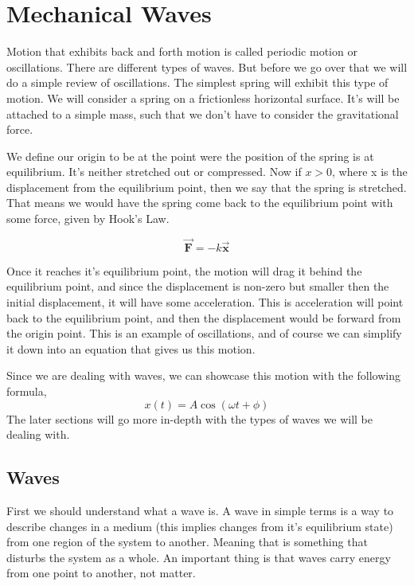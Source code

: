 \chapter{Mechanical Waves}
Motion that exhibits back and forth motion is called periodic motion or oscillations. There are different types of waves. But before we go over that we will do a simple review of oscillations. The simplest spring will exhibit this type of motion. We will consider a spring on a frictionless horizontal surface. It's will be attached to a simple mass, such that we don't have to consider the gravitational force. 

We define our origin to be at the point were the position of the spring is at equilibrium. It's neither stretched out or compressed. Now if $x > 0$, where x is the displacement from the equilibrium point, then we say that the spring is stretched. That means we would have the spring come back to the equilibrium point with some force, given by Hook's Law.

\begin{equation*}
	\vec{\mathbf{F}} = -k\vec{\mathbf{x}}
\end{equation*} 

Once it reaches it's equilibrium point, the motion will drag it behind the equilibrium point, and since the displacement is non-zero but smaller then the initial displacement, it will have some acceleration. This is acceleration will point back to the equilibrium point, and then the displacement would be forward from the origin point. This is an example of oscillations, and of course we can simplify it down into an equation that gives us this motion. 

Since we are dealing with waves, we can showcase this motion with the following formula, 
\begin{equation*}
	x(t) = A\cos(\omega t + \phi )
\end{equation*}
The later sections will go more in-depth with the types of waves we will be dealing with.

\section{Waves}

First we should understand what a wave is. A wave in simple terms is a way to describe changes in a medium (this implies changes from it's equilibrium state) from one region of the system to another. Meaning that is something that disturbs the system as a whole. An important thing is that waves carry energy from one point to another, not matter. 

